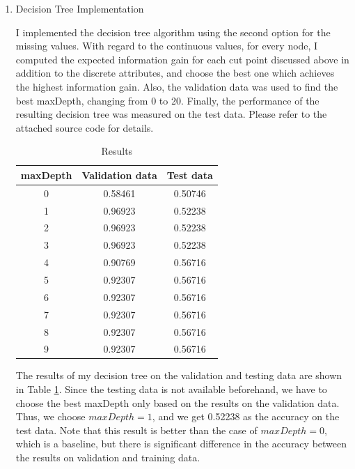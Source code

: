 \begin{enumerate}
\item Decision Tree Implementation

I implemented the decision tree algorithm using the second option for the missing values. With regard to the continuous values, for every node, I computed the expected information gain for each cut point discussed above in addition to the discrete attributes, and choose the best one which achieves the highest information gain. Also, the validation data was used to find the best maxDepth, changing from 0 to 20. Finally, the performance of the resulting decision tree was measured on the test data. Please refer to the attached source code for details.

\begin{table}[htb]
\begin{center}
\caption{Results}
\begin{tabular}{|c|c|c|} \hline
maxDepth & Validation data & Test data \\ \hline \hline
0 & 0.58461 & 0.50746 \\ \hline
1 & 0.96923 & 0.52238 \\ \hline
2 & 0.96923 & 0.52238 \\ \hline
3 & 0.96923 & 0.52238 \\ \hline
4 & 0.90769 & 0.56716 \\ \hline
5 & 0.92307 & 0.56716 \\ \hline
6 & 0.92307 & 0.56716 \\ \hline
7 & 0.92307 & 0.56716 \\ \hline
8 & 0.92307 & 0.56716 \\ \hline
9 & 0.92307 & 0.56716 \\ \hline
\end{tabular}
\label{tab:result}
\end{center}
\end{table}

The results of my decision tree on the validation and testing data are shown in Table \ref{tab:result}. Since the testing data is not available beforehand, we have to choose the best maxDepth only based on the results on the validation data. Thus, we choose $maxDepth=1$, and we get 0.52238 as the accuracy on the test data. Note that this result is better than the case of $maxDepth=0$, which is a baseline, but there is significant difference in the accuracy between the results on validation and training data.


\end{enumerate}
